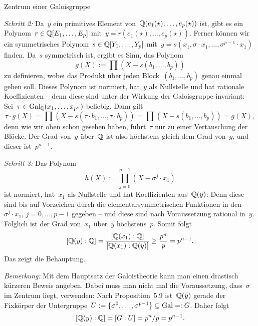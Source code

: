 \documentclass{algblatt}
\begin{document}
\begin{aufgabe}{Zentrum einer Galoisgruppe}
\begin{loesungE}
\emph{Schritt 2:} Da~$y$ ein primitives Element
von~$\mathbb{Q}(e_1(\star),\ldots,e_p(\star))$ ist, gibt es ein
Polynom~$r \in \mathbb{Q}[E_1,\ldots,E_p]$ mit~$y = r(e_1(\star),\ldots,e_p(\star))$. Ferner
können wir ein symmetrisches Polynom~$s \in \mathbb{Q}[Y_1,\ldots,Y_p]$ mit~$y = s(x_1, \sigma
\cdot x_1,\ldots, \sigma^{p-1} \cdot x_1)$ finden. Da~$s$ symmetrisch ist,
ergibt es Sinn, das Polynom
\[ g(X) := \prod (X - s(b_1,\ldots,b_p)) \]
zu definieren, wobei das Produkt über jeden Block~$(b_1,\ldots,b_p)$ genau
einmal gehen soll. Dieses Polynom ist normiert, hat~$y$ als Nullstelle und hat rationale
Koeffizienten -- denn diese sind unter der Wirkung der Galoisgruppe invariant:
Sei~$\tau \in \mathrm{Gal}_{\mathbb{Q}}(x_1,\ldots,x_{p^n})$ beliebig. Dann gilt
\[ \tau \cdot g(X) = \prod (X - s(\tau \cdot b_1,\ldots,\tau \cdot b_p)) =
  \prod (X - s(b_1,\ldots,b_p)) = g(X), \]
denn wie wir oben schon gesehen haben, führt~$\tau$ nur zu einer Vertauschung
der Blöcke. Der Grad von~$y$ über~$\mathbb{Q}$ ist also höchstens gleich dem Grad
von~$g$, und dieser ist~$p^{n-1}$.

\emph{Schritt 3:} Das Polynom
\[ h(X) := \prod_{j=0}^{p-1} (X - \sigma^j \cdot x_1) \]
ist normiert, hat~$x_1$ als Nullstelle und hat Koeffizienten aus~$\mathbb{Q}(y)$: Denn
diese sind bis auf Vorzeichen durch die elementarsymmetrischen Funktionen in
den~$\sigma^j \cdot x_1$, $j = 0,\ldots,p-1$ gegeben -- und diese sind nach
Voraussetzung rational in~$y$. Folglich ist der Grad von~$x_1$ über~$y$
höchstens~$p$. Somit folgt
\[ [\mathbb{Q}(y):\mathbb{Q}] = \frac{[\mathbb{Q}(x_1):\mathbb{Q}]}{[\mathbb{Q}(x_1):\mathbb{Q}(y)]} \geq
\frac{p^n}{p} = p^{n-1}. \]
Das zeigt die Behauptung.

\emph{Bemerkung:} Mit dem Hauptsatz der Galoistheorie kann man einen
drastisch kürzeren Beweis angeben. Dabei muss man nicht mal die Voraussetzung,
dass~$\sigma$ im Zentrum liegt, verwenden: Nach
Proposition~5.9 ist~$\mathbb{Q}(y)$ gerade der Fixkörper der Untergruppe~$U := \{
\sigma^0,\ldots,\sigma^{p-1} \} \subseteq \mathrm{Gal} =: G$. Daher folgt
\[ [\mathbb{Q}(y):\mathbb{Q}] = [G:U] = p^n / p = p^{n-1}. \]
\end{loesungE}
\end{aufgabe}
\end{document}
